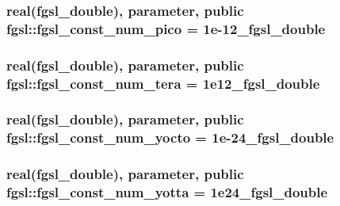 \hypertarget{classfgsl_a8a137e17b45fbfd8a37ef012e9b522ab}{
\subsubsection[{fgsl\-\_\-const\-\_\-num\-\_\-pico}]{\setlength{\rightskip}{0pt plus 5cm}real({\bf fgsl\-\_\-double}), parameter, public fgsl\-::fgsl\-\_\-const\-\_\-num\-\_\-pico = 1e-\/12\-\_\-fgsl\-\_\-double}}\label{classfgsl_a8a137e17b45fbfd8a37ef012e9b522ab}
\hypertarget{classfgsl_a6b39aa71fe2d5af7fa748710f70afd58}{
\subsubsection[{fgsl\-\_\-const\-\_\-num\-\_\-tera}]{\setlength{\rightskip}{0pt plus 5cm}real({\bf fgsl\-\_\-double}), parameter, public fgsl\-::fgsl\-\_\-const\-\_\-num\-\_\-tera = 1e12\-\_\-fgsl\-\_\-double}}\label{classfgsl_a6b39aa71fe2d5af7fa748710f70afd58}
\hypertarget{classfgsl_a97bcc951d0797621c0a06cb1d63cad49}{
\subsubsection[{fgsl\-\_\-const\-\_\-num\-\_\-yocto}]{\setlength{\rightskip}{0pt plus 5cm}real({\bf fgsl\-\_\-double}), parameter, public fgsl\-::fgsl\-\_\-const\-\_\-num\-\_\-yocto = 1e-\/24\-\_\-fgsl\-\_\-double}}\label{classfgsl_a97bcc951d0797621c0a06cb1d63cad49}
\hypertarget{classfgsl_a0b9812de1b4fd0e830437a0f81756409}{
\subsubsection[{fgsl\-\_\-const\-\_\-num\-\_\-yotta}]{\setlength{\rightskip}{0pt plus 5cm}real({\bf fgsl\-\_\-double}), parameter, public fgsl\-::fgsl\-\_\-const\-\_\-num\-\_\-yotta = 1e24\-\_\-fgsl\-\_\-double}}\label{classfgsl_a0b9812de1b4fd0e830437a0f81756409}
